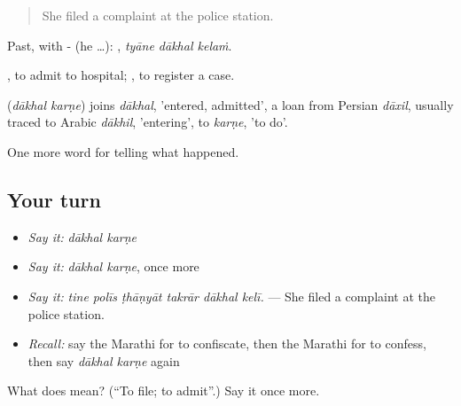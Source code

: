 \begin{quote}
She filed a complaint at the police station.
\end{quote}

Past, with - (he …):   , \emph{tyāne dākhal kelaṁ}.

  , to admit to hospital;   , to register a case.

\begin{cousinweb}
\textbf{ } (\emph{dākhal karṇe}) joins \emph{dākhal}, 'entered, admitted', a loan from Persian \emph{dāxil}, usually traced to Arabic \emph{dākhil}, 'entering', to \emph{karṇe}, 'to do'.
\end{cousinweb}

\begin{grammarlens}[title={What you've built}]
One more word for telling what happened.
\end{grammarlens}

\subsection*{Your turn}
\begin{itemize}
\raggedright
  \item \emph{Say it:} \emph{dākhal karṇe}
  \item \emph{Say it:} \emph{dākhal karṇe}, once more
  \item \emph{Say it:} \emph{tine polīs ṭhāṇyāt takrār dākhal kelī.} — She filed a complaint at the police station.
  \item \emph{Recall:} say the Marathi for to confiscate, then the Marathi for to confess, then say \emph{dākhal karṇe} again
\end{itemize}

\begin{tcolorbox}[breakable,colback=teal!4,colframe=teal!35!black,title={Before you move on}]
What does   mean? (\textquotedblleft{}To file; to admit\textquotedblright{}.) Say it once more.
\end{tcolorbox}
